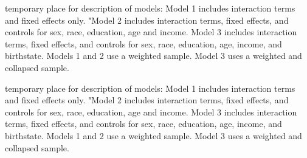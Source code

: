 \documentclass[]{article}
\begin{document}
\begin{landscape}
\begin{center}

\end{center}
\end{landscape}


\clearpage




temporary place for description of models:
Model 1 includes interaction terms and fixed effects only. "Model 2 includes interaction terms, fixed effects, and controls for sex, race, education, age and income. Model 3 includes interaction terms, fixed effects, and controls for sex, race, education, age, income, and birthstate. Models 1 and 2 use a weighted sample. Model 3 uses a weighted and collapsed sample.

\clearpage


temporary place for description of models:
Model 1 includes interaction terms and fixed effects only. "Model 2 includes interaction terms, fixed effects, and controls for sex, race, education, age and income. Model 3 includes interaction terms, fixed effects, and controls for sex, race, education, age, income, and birthstate. Models 1 and 2 use a weighted sample. Model 3 uses a weighted and collapsed sample.
\end{document}

